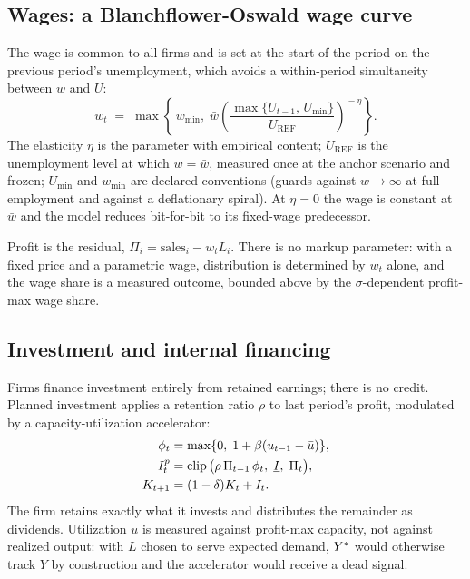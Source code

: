 \subsection{Wages: a Blanchflower-Oswald wage curve}

The wage is common to all firms and is set at the start of the period on the
previous period's unemployment, which avoids a within-period
simultaneity between $w$ and $U$:
\begin{equation}
  w_t \;=\; \max\!\left\{\, w_{\min},\;
    \bar{w}\left(\frac{\max\{U_{t-1},\,U_{\min}\}}{U_{\mathrm{REF}}}
    \right)^{\!-\eta} \right\}.
  \label{eq:wagecurve}
\end{equation}
The elasticity $\eta$ is the parameter with empirical content;
$U_{\mathrm{REF}}$ is the unemployment level at which $w = \bar{w}$, measured
once at the anchor scenario and frozen; $U_{\min}$ and $w_{\min}$ are declared
conventions (guards against $w \to \infty$ at full employment and against a
deflationary spiral). At $\eta = 0$ the wage is constant at $\bar w$ and the
model reduces bit-for-bit to its fixed-wage predecessor.

Profit is the residual, $\Pi_i = \text{sales}_i - w_t L_i$. There is no markup
parameter: with a fixed price and a parametric wage, distribution is
determined by $w_t$ alone, and the wage share is a measured outcome,
bounded above by the $\sigma$-dependent profit-max wage share.

\subsection{Investment and internal financing}

Firms finance investment entirely from retained earnings; there is no
credit. Planned investment applies a retention ratio $\rho$ to last period's
profit, modulated by a capacity-utilization accelerator:
\begin{align}
  \phi_t      &= \max\{0,\; 1 + \beta (u_{t-1} - \bar{u})\},
  \label{eq:accelerator}\\
  I^{p}_{t}   &= \operatorname{clip}\big(\rho\, \Pi_{t-1}\, \phi_t,\;
                  \underline{I},\; \Pi_{t}\big),
  \label{eq:investment}\\
  K_{t+1}     &= (1-\delta) K_t + I_t .
  \label{eq:capital}
\end{align}
The firm retains exactly what it invests and distributes the remainder as
dividends. Utilization $u$ is measured against profit-max capacity, not
against realized output: with $L$ chosen to serve expected demand, $Y^{\ast}$
would otherwise track $Y$ by construction and the accelerator would receive a
dead signal.

